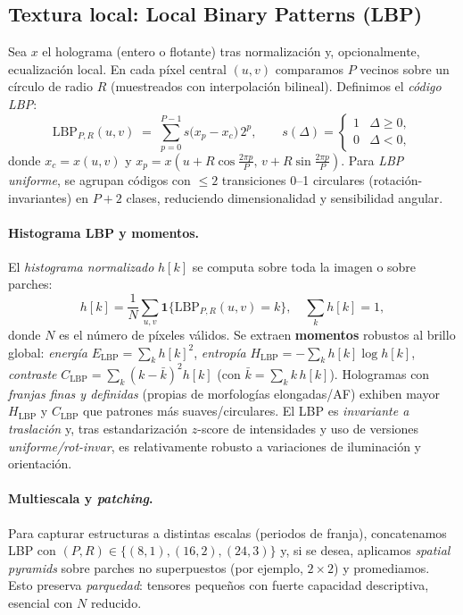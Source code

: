 \subsection{Textura local: Local Binary Patterns (LBP)}
\label{subsec:lbp}

Sea $x$ el holograma (entero o flotante) tras normalización y, opcionalmente, ecualización local. En cada píxel central $(u,v)$ comparamos $P$ vecinos sobre un círculo de radio $R$ (muestreados con interpolación bilineal). Definimos el \emph{código LBP}:
\begin{equation}
\mathrm{LBP}_{P,R}(u,v) \;=\; \sum_{p=0}^{P-1} s\!\Big(x_p - x_c\Big)\,2^p, 
\qquad s(\Delta) = \begin{cases}
1 & \Delta \ge 0,\\
0 & \Delta < 0,
\end{cases}
\label{eq:lbp}
\end{equation}
donde $x_c=x(u,v)$ y $x_p=x(u+R\cos\frac{2\pi p}{P},\, v+R\sin\frac{2\pi p}{P})$. Para \emph{LBP uniforme}, se agrupan códigos con $\le 2$ transiciones 0--1 circulares (rotación-invariantes) en $P+2$ clases, reduciendo dimensionalidad y sensibilidad angular.

\paragraph{Histograma LBP y momentos.} El \emph{histograma normalizado} $h[k]$ se computa sobre toda la imagen o sobre parches:
\begin{equation}
h[k] = \frac{1}{N}\sum_{u,v} \mathbf{1}\big\{\mathrm{LBP}_{P,R}(u,v)=k\big\}, 
\quad \sum_{k} h[k]=1,
\end{equation}
donde $N$ es el número de píxeles válidos. Se extraen \textbf{momentos} robustos al brillo global: \emph{energía} $E_\text{LBP}=\sum_k h[k]^2$, \emph{entropía} $H_\text{LBP}=-\sum_k h[k]\log h[k]$, \emph{contraste} $C_\text{LBP}=\sum_k (k-\bar{k})^2 h[k]$ (con $\bar{k}=\sum_k k\,h[k]$). Hologramas con \emph{franjas finas y definidas} (propias de morfologías elongadas/AF) exhiben mayor $H_\text{LBP}$ y $C_\text{LBP}$ que patrones más suaves/circulares. El LBP es \emph{invariante a traslación} y, tras estandarización $z$-score de intensidades y uso de versiones \emph{uniforme/rot-invar}, es relativamente robusto a variaciones de iluminación y orientación.

\paragraph{Multiescala y \emph{patching}.} Para capturar estructuras a distintas escalas (periodos de franja), concatenamos LBP con $(P,R)\in\{(8,1),(16,2),(24,3)\}$ y, si se desea, aplicamos \emph{spatial pyramids} sobre parches no superpuestos (por ejemplo, $2\times2$) y promediamos. Esto preserva \emph{parquedad}: tensores pequeños con fuerte capacidad descriptiva, esencial con $N$ reducido.

